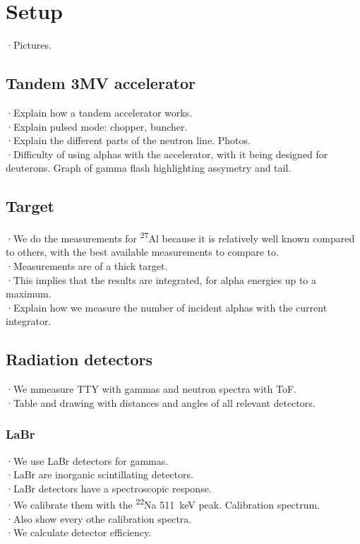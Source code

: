 \documentclass[a4paper,12pt]{report}
\newcommand{\Aliso}{\textsuperscript{27}Al }
\newcommand{\Na}{\textsuperscript{22}Na }
\begin{document}
\section{Setup}
·Pictures.\\
\subsection{Tandem 3MV accelerator}
·Explain how a tandem accelerator works.\\
·Explain pulsed mode: chopper, buncher.\\
·Explain the different parts of the neutron line. Photos.\\
·Difficulty of using alphas with the accelerator, with it being designed for deuterons. Graph of gamma flash highlighting assymetry and tail.\\

\subsection{Target}
·We do the measurements for \Aliso because it is relatively well known compared to others, with the best available measurements to compare to.\\
·Measurements are of a thick target.\\
·This implies that the results are integrated, for alpha energies up to a maximum.\\
·Explain how we measure the number of incident alphas with the current integrator.\\

\subsection{Radiation detectors}
·We mmeasure TTY with gammas and neutron spectra with ToF.\\
·Table and drawing with distances and angles of all relevant detectors.\\

\subsubsection{LaBr}
·We use LaBr detectors for gammas.\\
·LaBr are inorganic scintillating detectors.\\
·LaBr detectors have a spectroscopic response.\\

·We calibrate them with the \Na \qty{511}{\keV} peak. Calibration spectrum.\\
·Also show every othe calibration spectra.\\
·We calculate detector efficiency.\\
\end{document}

